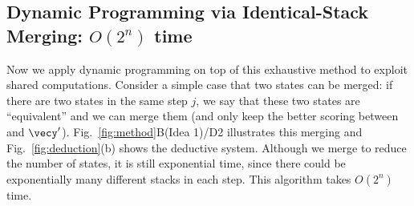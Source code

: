 



\subsection*{Dynamic Programming via Identical-Stack Merging:
  $O(2^{n})$ time}

Now we apply dynamic programming on top of this exhaustive method to exploit
shared computations.
Consider a simple case that two states can be merged: if
there are two states in the same step $j$,
we say that these two states are ``equivalent'' and we can merge them
(and only keep the better scoring between \vecy and $\vecy'$). 
Fig.~\ref{fig:method}B(Idea 1)/D2 illustrates this merging and
Fig.~\ref{fig:deduction}(b) shows the deductive system. 
Although we merge to reduce the number of states, it is still exponential time, 
since there could be exponentially many
different stacks in each step. 
This algorithm takes $O(2^{n})$ time. 

